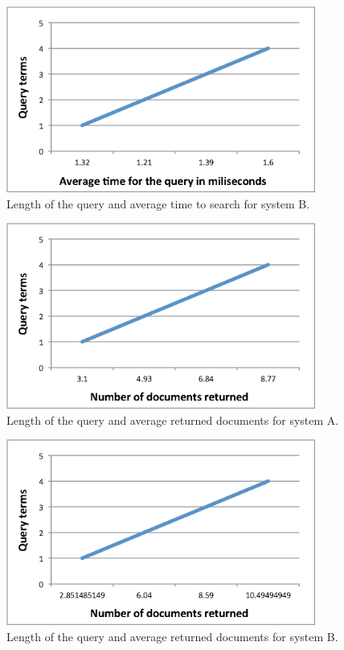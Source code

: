 \documentclass[letterpaper,10pt]{article}
\begin{document}
\begin{figure}[H]
    \centering
    \includegraphics[width=4in]{queryterms-timeB.eps}
    \caption{ Length of the query and average time to search for system B. }
    \label{Query structure}
\end{figure}

\begin{figure}[H]
    \centering
    \includegraphics[width=4in]{queryterms-returnA.eps}
    \caption{ Length of the query and average returned documents for system A. }
    \label{Query structure}
\end{figure}

\begin{figure}[H]
    \centering
    \includegraphics[width=4in]{queryterms-returnB.eps}
    \caption{ Length of the query and average returned documents for system B. }
    \label{Query structure}
\end{figure}
\end{document}
